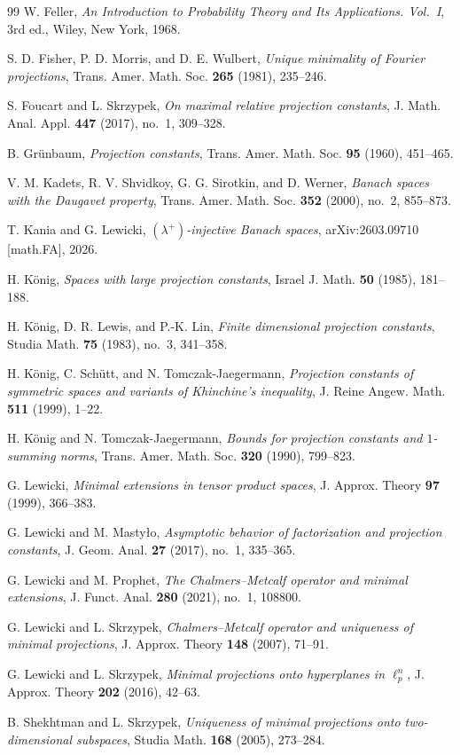 \documentclass[11pt]{amsart}
\numberwithin{equation}{section}
\theoremstyle{definition}
\theoremstyle{remark}
\begin{document}
\begin{thebibliography}{99}
W. Feller,
\emph{An Introduction to Probability Theory and Its Applications. Vol.~I},
3rd ed., Wiley, New York, 1968.

S. D. Fisher, P. D. Morris, and D. E. Wulbert,
\emph{Unique minimality of Fourier projections},
Trans. Amer. Math. Soc. \textbf{265} (1981), 235--246.

S. Foucart and L. Skrzypek,
\emph{On maximal relative projection constants},
J. Math. Anal. Appl. \textbf{447} (2017), no.~1, 309--328.

B. Grünbaum,
\emph{Projection constants},
Trans. Amer. Math. Soc. \textbf{95} (1960), 451--465.

V. M. Kadets, R. V. Shvidkoy, G. G. Sirotkin, and D. Werner,
\emph{Banach spaces with the Daugavet property},
Trans. Amer. Math. Soc. \textbf{352} (2000), no.~2, 855--873.

T. Kania and G. Lewicki,
\emph{$(\lambda^+)$-injective Banach spaces},
arXiv:2603.09710 [math.FA], 2026.

H. König,
\emph{Spaces with large projection constants},
Israel J. Math. \textbf{50} (1985), 181--188.

H. König, D. R. Lewis, and P.-K. Lin,
\emph{Finite dimensional projection constants},
Studia Math. \textbf{75} (1983), no.~3, 341--358.

H. König, C. Schütt, and N. Tomczak-Jaegermann,
\emph{Projection constants of symmetric spaces and variants of Khinchine's inequality},
J. Reine Angew. Math. \textbf{511} (1999), 1--22.

H. König and N. Tomczak-Jaegermann,
\emph{Bounds for projection constants and $1$-summing norms},
Trans. Amer. Math. Soc. \textbf{320} (1990), 799--823.

G. Lewicki,
\emph{Minimal extensions in tensor product spaces},
J. Approx. Theory \textbf{97} (1999), 366--383.

G. Lewicki and M. Mastyło,
\emph{Asymptotic behavior of factorization and projection constants},
J. Geom. Anal. \textbf{27} (2017), no.~1, 335--365.

G. Lewicki and M. Prophet,
\emph{The Chalmers--Metcalf operator and minimal extensions},
J. Funct. Anal. \textbf{280} (2021), no.~1, 108800.

G. Lewicki and L. Skrzypek,
\emph{Chalmers--Metcalf operator and uniqueness of minimal projections},
J. Approx. Theory \textbf{148} (2007), 71--91.

G. Lewicki and L. Skrzypek,
\emph{Minimal projections onto hyperplanes in $\ell_p^n$},
J. Approx. Theory \textbf{202} (2016), 42--63.

B. Shekhtman and L. Skrzypek,
\emph{Uniqueness of minimal projections onto two-dimensional subspaces},
Studia Math. \textbf{168} (2005), 273--284.

\end{thebibliography}
\end{document}
